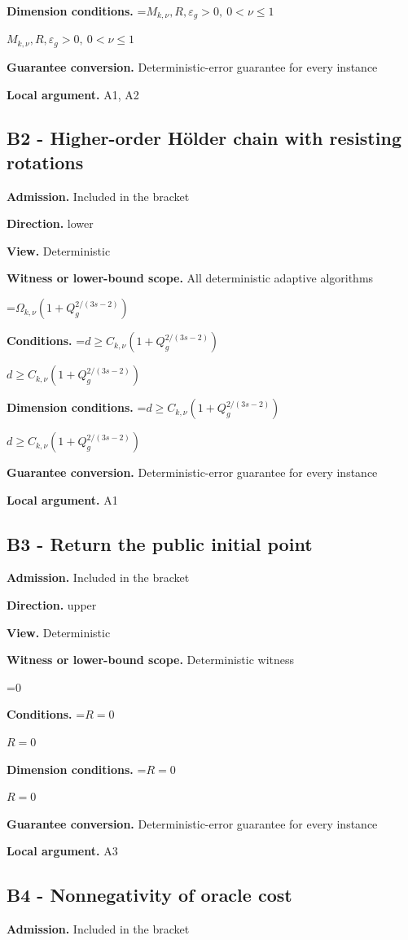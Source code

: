 \documentclass[10pt,a4paper]{article}
\newcommand{\AtlasMath}[1]{\par\begingroup\centering\setbox0=\hbox{$\displaystyle #1$}\ifdim\wd0>1.4\linewidth\typeout{ATLAS WIDE FORMULA: \the\wd0}\fi\ifdim\wd0>\linewidth\resizebox{\linewidth}{!}{\box0}\else\box0\fi\par\endgroup}
\newcommand{\AtlasInlineMath}[1]{\begingroup\setbox0=\hbox{$#1$}\ifdim\wd0>.4\linewidth\endgroup\AtlasMath{#1}\else\endgroup$#1$\fi}
\begin{document}
\textbf{Dimension conditions.} \AtlasInlineMath{M_{k,\nu},R,\varepsilon_g>0,\ 0<\nu\le1}

\textbf{Guarantee conversion.} Deterministic-error guarantee for every instance

\textbf{Local argument.} A1, A2

\subsection{B2 - Higher-order Hölder chain with resisting rotations}
\textbf{Admission.} Included in the bracket

\textbf{Direction.} lower

\textbf{View.} Deterministic

\textbf{Witness or lower-bound scope.} All deterministic adaptive algorithms

\AtlasMath{\Omega_{k,\nu}(1+Q_g^{2/(3s-2)})}
\textbf{Conditions.} \AtlasInlineMath{d\ge C_{k,\nu}(1+Q_g^{2/(3s-2)})}

\textbf{Dimension conditions.} \AtlasInlineMath{d\ge C_{k,\nu}(1+Q_g^{2/(3s-2)})}

\textbf{Guarantee conversion.} Deterministic-error guarantee for every instance

\textbf{Local argument.} A1

\subsection{B3 - Return the public initial point}
\textbf{Admission.} Included in the bracket

\textbf{Direction.} upper

\textbf{View.} Deterministic

\textbf{Witness or lower-bound scope.} Deterministic witness

\AtlasMath{0}
\textbf{Conditions.} \AtlasInlineMath{R=0}

\textbf{Dimension conditions.} \AtlasInlineMath{R=0}

\textbf{Guarantee conversion.} Deterministic-error guarantee for every instance

\textbf{Local argument.} A3

\subsection{B4 - Nonnegativity of oracle cost}
\textbf{Admission.} Included in the bracket
\end{document}
